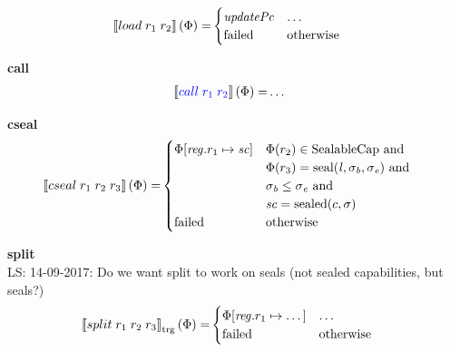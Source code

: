 \documentclass[a4paper]{article}
\newcommand\lau[1]{{\color{purple} \sf \footnotesize {LS: #1}}\\}
\newcommand{\sem}[1]{\left\llbracket #1 \right\rrbracket}
\newcommand{\tsem}[2][\Phi]{\sem{#2}_{\mathrm{trg}}(#1)}
\newcommand{\tand}{\text{ and }}
\newcommand{\totherwise}{\text{otherwise }}
\newcommand{\sourcecolor}[1]{\color{blue}}
\newcommand{\src}[1]{{\sourcecolor{} #1}}
\newcommand{\targetcolor}[1]{\color{black}}
\newcommand{\trg}[1]{{\targetcolor{} #1}}
\newcommand{\zinstr}[1]{#1}
\newcommand{\twoinstr}[3]{
  \ifthenelse{\equal{#2#3}{}}
  {\zinstr{#1}}
  {\zinstr{#1} \; #2 \; #3}
}
\newcommand{\threeinstr}[4]{
  \ifthenelse{\equal{#2#3#4}{}}
  {\zinstr{#1}}
  {\zinstr{#1} \; #2 \; #3 \; #4}
}
\newcommand{\scall}[2]{\twoinstr{\src{call}}{#1}{#2}}
\newcommand{\tload}[2]{\twoinstr{\trg{load}}{#1}{#2}}
\newcommand{\tsplit}[3]{\threeinstr{\trg{split}}{#1}{#2}{#3}}
\newcommand{\tcseal}[3]{\threeinstr{\trg{cseal}}{#1}{#2}{#3}}
\newcommand{\update}[2]{[#1 \mapsto #2]}
\newcommand{\updReg}[2]{\update{\reg.#1}{#2}}
\newcommand{\shareddom}[1]{\mathrm{#1}}
\newcommand{\SealableCaps}{\shareddom{SealableCap}}
\newcommand{\lin}{\var{l}}
\newcommand{\seal}[1]{\shareddom{seal}(#1)}
\newcommand{\sealed}[1]{\shareddom{sealed}(#1)}
\newcommand{\failed}{\mathrm{failed}}
\newcommand{\var}[1]{\mathit{#1}}
\newcommand{\reg}{\var{reg}}
\newcommand{\vsc}{\var{sc}}
\newcommand{\baddr}{\var{b}}
\newcommand{\eaddr}{\var{e}}
\newcommand{\plainfun}[2]{
  \ifthenelse{\equal{#2}{}}
  {\mathit{#1}}
  {\mathit{#1}(#2)}
}
\newcommand{\updPcAddr}[1]{\plainfun{updatePc}{#1}}
\begin{document}
\begin{align*}
  \sem{\tload{r_1}{r_2}}(\Phi) = & 
                                  \begin{cases}
                                    \updPcAddr{} & \dots\\
                                    \failed & \totherwise                                    
                                  \end{cases}
\end{align*}







\noindent\textbf{call}\\
\begin{align*}
  \sem{\scall{\src{r_1}}{\src{r_2}}}(\Phi) = & \dots
\end{align*}

\noindent\textbf{cseal}\\
\begin{align*}
  \sem{\tcseal{r_1}{r_2}{r_3}}(\Phi) = &
                                  \begin{cases}
                                    \Phi\updReg{r_1}{\vsc} &
                                    \arraycolsep=0pt
                                    \begin{array}[t]{l}
                                      \Phi(r_2) \in \SealableCaps \tand \\
                                      \Phi(r_3) = \seal{\lin, \sigma_\baddr, \sigma_\eaddr} \tand \\
                                      \sigma_\baddr \leq \sigma_\eaddr \tand \\ 
                                      \vsc = \sealed{c,\sigma}
                                    \end{array}
                                    \\
                                    \failed & \totherwise
                                  \end{cases}
\end{align*}




\textbf{split}\\
\lau{14-09-2017: Do we want split to work on seals (not sealed capabilities, but seals?)}
\begin{align*}
  \tsem{\tsplit{r_1}{r_2}{r_3}} = &
                               \begin{cases}
                                 \Phi\updReg{r_1}{\dots} &
                                 \arraycolsep=0pt
                                 \begin{array}[t]{l}
                                   \dots
                                 \end{array}\\
                                 \failed & \totherwise
                               \end{cases}
\end{align*}
\end{document}
